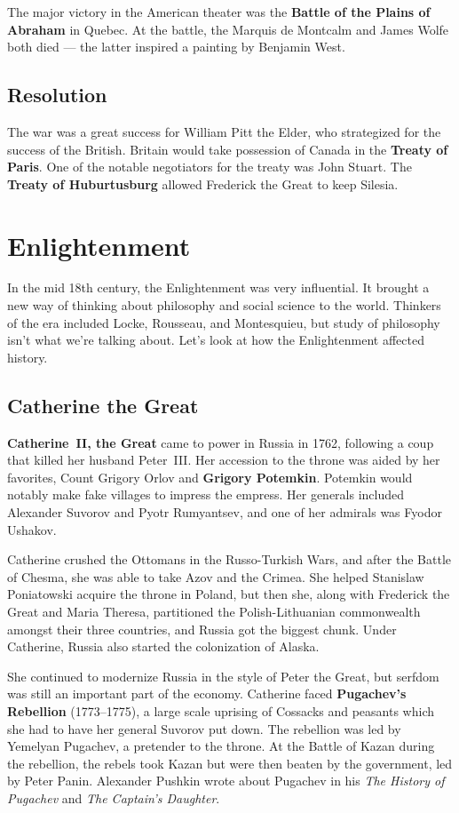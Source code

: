 The major victory in the American theater was the \textbf{Battle of the Plains of Abraham} in Quebec.
At the battle, the Marquis de Montcalm and James Wolfe both died --- the latter inspired a painting by Benjamin West.

\subsection*{Resolution}

The war was a great success for William Pitt the Elder, who strategized for the success of the British.
Britain would take possession of Canada in the \textbf{Treaty of Paris}.
One of the notable negotiators for the treaty was John Stuart.
The \textbf{Treaty of Huburtusburg} allowed Frederick the Great to keep Silesia.

\section{Enlightenment}

In the mid 18th century, the Enlightenment was very influential.
It brought a new way of thinking about philosophy and social science to the world.
Thinkers of the era included Locke, Rousseau, and Montesquieu,
but study of philosophy isn't what we're talking about.
Let's look at how the Enlightenment affected history.

\subsection*{Catherine the Great}

\textbf{Catherine~II, the Great} came to power in Russia in 1762,
following a coup that killed her husband Peter~III\@.
Her accession to the throne was aided by her favorites, Count Grigory Orlov and \textbf{Grigory Potemkin}.
Potemkin would notably make fake villages to impress the empress.
Her generals included Alexander Suvorov and Pyotr Rumyantsev, and one of her admirals was Fyodor Ushakov.

Catherine crushed the Ottomans in the Russo-Turkish Wars,
and after the Battle of Chesma, she was able to take Azov and the Crimea.
She helped Stanislaw Poniatowski acquire the throne in Poland,
but then she, along with Frederick the Great and Maria Theresa,
partitioned the Polish-Lithuanian commonwealth amongst their three countries,
and Russia got the biggest chunk.
Under Catherine, Russia also started the colonization of Alaska.

She continued to modernize Russia in the style of Peter the Great,
but serfdom was still an important part of the economy.
Catherine faced \textbf{Pugachev's Rebellion} (1773--1775),
a large scale uprising of Cossacks and peasants which she had to have her general Suvorov put down.
The rebellion was led by Yemelyan Pugachev, a pretender to the throne.
At the Battle of Kazan during the rebellion,
the rebels took Kazan but were then beaten by the government, led by Peter Panin.
Alexander Pushkin wrote about Pugachev in his
\textit{The History of Pugachev} and \textit{The Captain's Daughter}.

